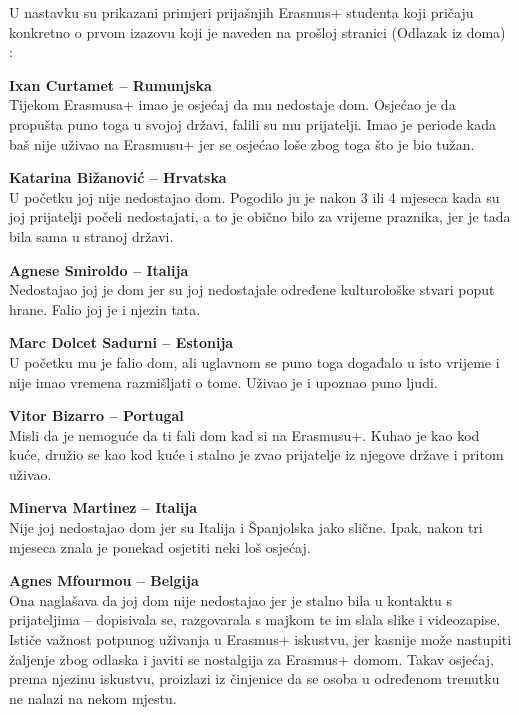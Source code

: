 \documentclass[]{foi}
\begin{document}
U nastavku su prikazani primjeri prijašnjih Erasmus+ studenta koji pričaju konkretno o prvom izazovu koji je naveden na prošloj stranici (Odlazak iz doma) \cite{erasmus_homesick_video_2024}:

\textbf{Ixan Curtamet – Rumunjska} \\
Tijekom Erasmusa+ imao je osjećaj da mu nedostaje dom. Osjećao je da propušta puno toga u svojoj državi, falili su mu prijatelji. Imao je periode kada baš nije uživao na Erasmusu+ 
jer se osjećao loše zbog toga što je bio tužan.

\vspace{1em}

\textbf{Katarina Bižanović – Hrvatska} \\
U početku joj nije nedostajao dom. Pogodilo ju je nakon 3 ili 4 mjeseca kada su joj prijatelji počeli nedostajati, a to je obično bilo za vrijeme praznika, jer je tada bila sama u stranoj državi.

\vspace{1em}

\textbf{Agnese Smiroldo – Italija} \\
Nedostajao joj je dom jer su joj nedostajale određene kulturološke stvari poput hrane. Falio joj je i njezin tata.

\vspace{1em}

\textbf{Marc Dolcet Sadurni – Estonija} \\
U početku mu je falio dom, ali uglavnom se puno toga događalo u isto vrijeme i nije imao vremena razmišljati o tome. Uživao je i upoznao puno ljudi.

\vspace{1em}

\textbf{Vitor Bizarro – Portugal} \\
Misli da je nemoguće da ti fali dom kad si na Erasmusu+. Kuhao je kao kod kuće, družio se kao kod kuće i stalno je zvao prijatelje iz njegove države i pritom uživao.

\vspace{1em}

\textbf{Minerva Martinez – Italija} \\
Nije joj nedostajao dom jer su Italija i Španjolska jako slične. Ipak, nakon tri mjeseca znala je ponekad osjetiti neki loš osjećaj.

\vspace{1em}

\textbf{Agnes Mfourmou – Belgija} \\
Ona naglašava da joj dom nije nedostajao jer je stalno bila u kontaktu s prijateljima – dopisivala se, razgovarala s majkom te im slala slike i videozapise. 
Ističe važnost potpunog uživanja u Erasmus+ iskustvu, jer kasnije može nastupiti žaljenje zbog odlaska i javiti se nostalgija za Erasmus+ domom. 
Takav osjećaj, prema njezinu iskustvu, proizlazi iz činjenice da se osoba u određenom trenutku ne nalazi na nekom mjestu.
\end{document}
